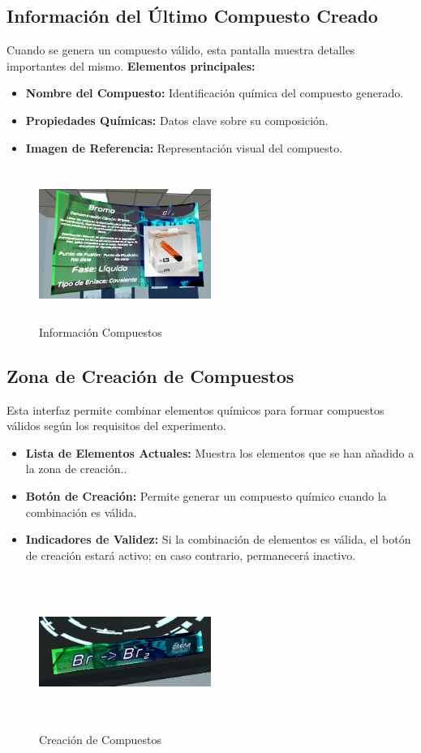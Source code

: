 \subsection{Información del Último Compuesto Creado}
Cuando se genera un compuesto válido, esta pantalla muestra detalles importantes del mismo.
\textbf{Elementos principales:}
\begin{itemize}
    \item \textbf{Nombre del Compuesto:} Identificación química del compuesto generado.
    \item \textbf{Propiedades Químicas:} Datos clave sobre su composición.
    \item \textbf{Imagen de Referencia:} Representación visual del compuesto.
\end{itemize}
\begin{figure}[thbp]
    \centering
    \includegraphics[width=0.5\textwidth, height = 5cm]{img/GUI/UI_Compuestos.png}
    \caption{Información Compuestos}
    \label{fig:Información_Compuestos}
\end{figure}
\subsection{Zona de Creación de Compuestos}
Esta interfaz permite combinar elementos químicos para formar compuestos válidos según los requisitos del experimento.
\begin{itemize}
    \item \textbf{Lista de Elementos Actuales:} Muestra los elementos que se han añadido a la zona de creación..
    \item \textbf{Botón de Creación:} Permite generar un compuesto químico cuando la combinación es válida.
    \item \textbf{Indicadores de Validez:} Si la combinación de elementos es válida, el botón de creación estará activo; en caso contrario, permanecerá inactivo.
\end{itemize}
\begin{figure}[thbp]
    \centering
    \includegraphics[width=0.5\textwidth, height = 5cm]{img/GUI/UI_Creacion.png}
    \caption{Creación de Compuestos}
    \label{fig:Creación_de_Compuestos}
\end{figure}
